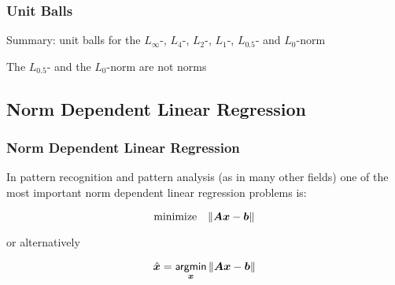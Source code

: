 \begin{frame}
  \frametitle{Unit Balls \cont}

  Summary: unit balls for the $L_{\infty}$-, $L_4$-, $L_2$-, $L_1$-, $L_{0.5}$- and $L_0$-norm

  \begin{figure}
    \resizebox{\linewidth}{!}{
       \hspace{1cm}
       \hspace{1cm}
       \hspace{1cm}
       \hspace{1cm}
       \hspace{1cm}
       \hspace{1cm}
    }    
  \end{figure}

 The $L_{0.5}$- and the $L_0$-norm are not norms

\end{frame}



\subsection{Norm Dependent Linear Regression}

\begin{frame}
  \frametitle{Norm Dependent Linear Regression}

  In pattern recognition and pattern analysis (as in many other fields) one of the most important norm dependent linear regression problems is:

  \begin{displaymath}
   \mbox{minimize}\quad \| {\bm A} {\bm x} -{\bm b}\|
  \end{displaymath}

  or alternatively

  \begin{displaymath}
   \hat{{\bm x}} = \mathop{\mathsf{argmin}}_{{\bm x}} \| {\bm A} {\bm x} -{\bm b}\|
  \end{displaymath}
\end{frame}


